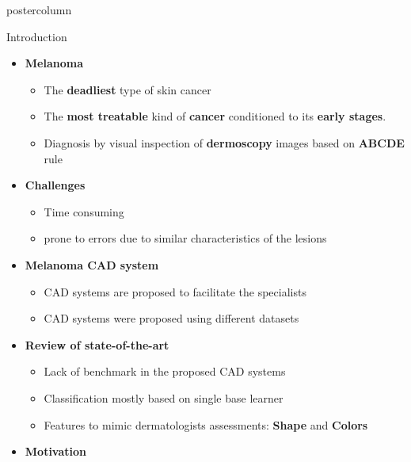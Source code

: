 \documentclass[final]{beamer}
\begin{document}
\begin{frame}
\begin{columns}
\begin{column}{.49\textwidth}
\begin{beamercolorbox}[center,wd=\textwidth]{postercolumn}
\begin{minipage}[T]{.95\textwidth}
{            %
            \begin{block}{Introduction}
              \begin{itemize}
               \item \textbf{\color{orounam}Melanoma}
               \begin{itemize}
               	\item The \textbf{deadliest} type of skin cancer
               	\item The \textbf{most treatable} kind of \textbf{cancer} conditioned to its \textbf{early stages}. 	
				\item Diagnosis by visual inspection of \textbf{dermoscopy} images based on \textbf{ABCDE} rule         	
               \end{itemize}
               \item \textbf{\color{orounam}Challenges}
               \begin{itemize}
                \item Time consuming 
                \item prone to errors due to similar characteristics of the lesions                
               \end{itemize}
               \item \textbf{\color{orounam} Melanoma CAD system } 
               \begin{itemize}
               	\item CAD systems are proposed to facilitate the specialists
               	\item CAD systems were proposed using different datasets 
               \end{itemize}
               \item \textbf{\color{orounam}Review of state-of-the-art}
               \begin{itemize}
               	\item Lack of benchmark in the proposed CAD systems 
               	\item Classification mostly based on single base learner
               	\item Features to mimic dermatologists assessments: \textbf{Shape} and \textbf{Colors}
               \end{itemize}
               \item \textbf{\color{orounam} Motivation}

\end{itemize}
\end{block}}
\end{minipage}
\end{beamercolorbox}
\end{column}
\end{columns}
\end{frame}
\end{document}
